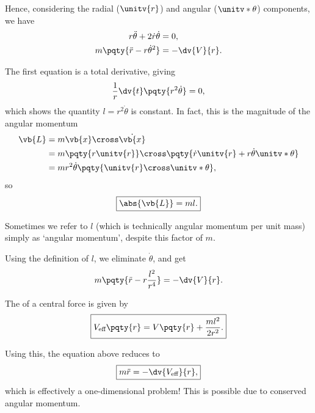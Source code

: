 Hence, considering the radial (\(\unitv{r}\)) and angular (\(\unitv*{\theta}\)) components, we have
\begin{subequations}\begin{align}
    r \ddot{\theta} + 2 \dot{r} \dot{\theta} &= 0, \\
    m \pqty{\ddot{r} - r \dot{\theta}^2} &= - \dv{V}{r}.
\end{align}\end{subequations}

The first equation is a total derivative, giving
\begin{equation}
    \frac{1}{r} \dv{t} \pqty{r^2 \dot{\theta}} = 0,
\end{equation}
which shows the quantity \(\boxed{l = r^2 \dot{\theta}}\) is constant. In fact, this is the magnitude of the angular momentum
\begin{subequations}\begin{align}
    \vb{L} &= m \vb{x} \cross \dot{\vb{x}} \\
    &= m \pqty{r \unitv{r}} \cross \pqty{\dot{r} \unitv{r} + r \dot{\theta} \unitv*{\theta}} \\
    &= m r^2 \dot{\theta} \pqty{\unitv{r} \cross \unitv*{\theta}},
\end{align}\end{subequations}
so
\begin{equation}
    \boxed{\abs{\vb{L}} = ml.}
\end{equation}

Sometimes we refer to \(l\) (which is technically angular momentum per unit mass) simply as `angular momentum', despite this factor of \(m\).

Using the definition of \(l\), we eliminate \(\dot{\theta}\), and get
\begin{equation}
    m \pqty{\ddot{r} - r \frac{l^2}{r^4}} = - \dv{V}{r}.
\end{equation}

\begin{definition}
    \label{def:effective-potential}%
    The  of a central force  is given by
    \begin{equation}
        \boxed{V_{\text{eff}} \pqty{r} = V \pqty{r} + \frac{m l^2}{2 r^2}.}
    \end{equation}
\end{definition}

Using this, the equation above reduces to
\begin{equation}
    \boxed{m \ddot{r} = - \dv{V_{\text{eff}}}{r},}
\end{equation}
which is effectively a one-dimensional problem! This is possible due to conserved angular momentum.

